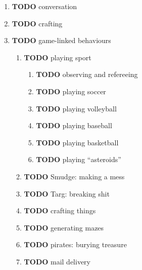 \documentclass[11pt]{article}
\begin{document}
\begin{enumerate}
\begin{enumerate}
\begin{enumerate}
\begin{enumerate}
\begin{enumerate}
\item {\bfseries\sffamily TODO} conversation
\label{sec-5-4-1-4-3-6-10}

\item {\bfseries\sffamily TODO} crafting
\label{sec-5-4-1-4-3-6-11}

\item {\bfseries\sffamily TODO} game-linked behaviours
\label{sec-5-4-1-4-3-6-12}

\begin{enumerate}
\item {\bfseries\sffamily TODO} playing sport
\label{sec-5-4-1-4-3-6-12-1}

\begin{enumerate}
\item {\bfseries\sffamily TODO} observing and refereeing
\label{sec-5-4-1-4-3-6-12-1-1}

\item {\bfseries\sffamily TODO} playing soccer
\label{sec-5-4-1-4-3-6-12-1-2}

\item {\bfseries\sffamily TODO} playing volleyball
\label{sec-5-4-1-4-3-6-12-1-3}

\item {\bfseries\sffamily TODO} playing baseball
\label{sec-5-4-1-4-3-6-12-1-4}

\item {\bfseries\sffamily TODO} playing basketball
\label{sec-5-4-1-4-3-6-12-1-5}

\item {\bfseries\sffamily TODO} playing “asteroids”
\label{sec-5-4-1-4-3-6-12-1-6}
\end{enumerate}
\item {\bfseries\sffamily TODO} Smudge: making a mess
\label{sec-5-4-1-4-3-6-12-2}

\item {\bfseries\sffamily TODO} Targ: breaking shit
\label{sec-5-4-1-4-3-6-12-3}

\item {\bfseries\sffamily TODO} crafting things
\label{sec-5-4-1-4-3-6-12-4}

\item {\bfseries\sffamily TODO} generating mazes
\label{sec-5-4-1-4-3-6-12-5}

\item {\bfseries\sffamily TODO} pirates: burying treasure
\label{sec-5-4-1-4-3-6-12-6}

\item {\bfseries\sffamily TODO} mail delivery
\label{sec-5-4-1-4-3-6-12-7}


\end{enumerate}
\end{enumerate}
\end{enumerate}
\end{enumerate}
\end{enumerate}
\end{enumerate}
\end{document}
